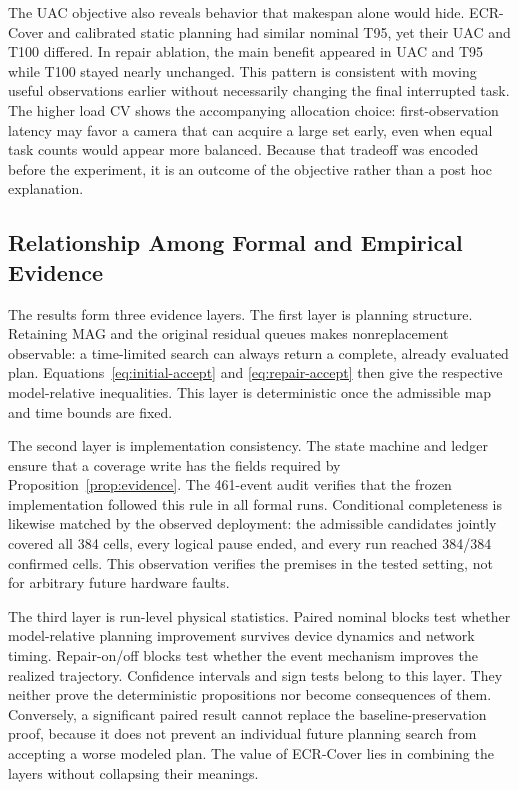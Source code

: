 The UAC objective also reveals behavior that makespan alone would hide. ECR-Cover and calibrated static planning had similar nominal T95, yet their UAC and T100 differed. In repair ablation, the main benefit appeared in UAC and T95 while T100 stayed nearly unchanged. This pattern is consistent with moving useful observations earlier without necessarily changing the final interrupted task. The higher load CV shows the accompanying allocation choice: first-observation latency may favor a camera that can acquire a large set early, even when equal task counts would appear more balanced. Because that tradeoff was encoded before the experiment, it is an outcome of the objective rather than a post hoc explanation.

\subsection{Relationship Among Formal and Empirical Evidence}

The results form three evidence layers. The first layer is planning structure. Retaining MAG and the original residual queues makes nonreplacement observable: a time-limited search can always return a complete, already evaluated plan. Equations~\eqref{eq:initial-accept} and \eqref{eq:repair-accept} then give the respective model-relative inequalities. This layer is deterministic once the admissible map and time bounds are fixed.

The second layer is implementation consistency. The state machine and ledger ensure that a coverage write has the fields required by Proposition~\ref{prop:evidence}. The 461-event audit verifies that the frozen implementation followed this rule in all formal runs. Conditional completeness is likewise matched by the observed deployment: the admissible candidates jointly covered all 384 cells, every logical pause ended, and every run reached 384/384 confirmed cells. This observation verifies the premises in the tested setting, not for arbitrary future hardware faults.

The third layer is run-level physical statistics. Paired nominal blocks test whether model-relative planning improvement survives device dynamics and network timing. Repair-on/off blocks test whether the event mechanism improves the realized trajectory. Confidence intervals and sign tests belong to this layer. They neither prove the deterministic propositions nor become consequences of them. Conversely, a significant paired result cannot replace the baseline-preservation proof, because it does not prevent an individual future planning search from accepting a worse modeled plan. The value of ECR-Cover lies in combining the layers without collapsing their meanings.


